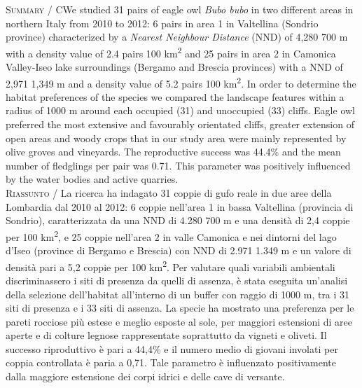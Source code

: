 {\small

\noindent \textsc{\color{MUSEBLUE} Summary} / CWe studied 31 pairs of eagle owl \textit{Bubo bubo} in two different
areas in northern Italy from 2010 to 2012: 6 pairs in area 1 in
Valtellina (Sondrio province) characterized by a \textit{Nearest
Neighbour Distance }(NND) of 4,280 {\textpm} 700 m with a density value
of 2.4 pairs 100 km\textsuperscript{{}2} and 25 pairs in area 2 in
Camonica Valley-Iseo lake surroundings (Bergamo and Brescia provinces)
with a NND of 2,971 {\textpm} 1,349 m and a density value of 5.2 pairs
100 km\textsuperscript{{}2}. In order to determine the habitat
preferences of the species we compared the landscape features within a
radius of 1000 m around each occupied (31) and unoccupied (33) cliffs.
Eagle owl preferred the most extensive and favourably orientated
cliffs, greater extension of open areas and woody crops that in our
study area were mainly represented by olive groves and vineyards. The
reproductive success was 44.4\% and the mean number of fledglings per
pair was 0.71. This parameter was positively influenced by the water
bodies and active quarries. \\
\noindent \textsc{\color{MUSEBLUE} Riassunto} / La ricerca ha indagato 31 coppie di gufo reale in due aree della
Lombardia dal 2010 al 2012: 6 coppie nell{\textquoteright}area 1 in
bassa Valtellina (provincia di Sondrio), caratterizzata da una NND di
4.280 {\textpm} 700 m e una densit\`a di 2,4 coppie per 100
km\textsuperscript{{}2}, e 25 coppie nell{\textquoteright}area 2 in
valle Camonica e nei dintorni del lago d{\textquoteright}Iseo (province
di Bergamo e Brescia) con NND di 2.971 {\textpm} 1.349 m e un valore di
densit\`a pari a 5,2 coppie per 100 km\textsuperscript{{}2}. Per
valutare quali variabili ambientali discriminassero i siti di presenza
da quelli di assenza, \`e stata eseguita un{\textquoteright}analisi
della selezione dell{\textquoteright}habitat
all{\textquoteright}interno di un buffer con raggio di 1000 m, tra i 31
siti di presenza e i 33 siti di assenza. La specie ha mostrato una
preferenza per le pareti rocciose pi\`u estese e meglio esposte al
sole, per maggiori estensioni di aree aperte e di colture legnose
rappresentate soprattutto da vigneti e oliveti. Il successo
riproduttivo \`e pari a 44,4\% e il numero medio di giovani involati
per coppia controllata \`e paria a 0,71. Tale parametro \`e influenzato
positivamente dalla maggiore estensione dei corpi idrici e delle cave
di versante.
}




